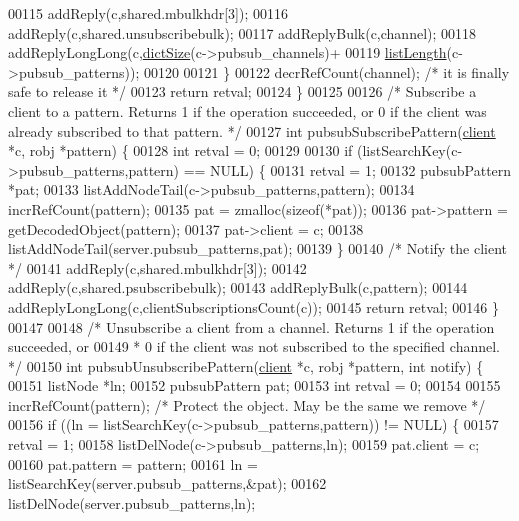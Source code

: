 \begin{DoxyCode}
00115         addReply(c,shared.mbulkhdr[3]);
00116         addReply(c,shared.unsubscribebulk);
00117         addReplyBulk(c,channel);
00118         addReplyLongLong(c,\hyperlink{dict_8h_af193430dd3d5579a52b194512f72c1f0}{dictSize}(c->pubsub\_channels)+
00119                        \hyperlink{adlist_8h_afde0ab079f934670e82119b43120e94b}{listLength}(c->pubsub\_patterns));
00120 
00121     \}
00122     decrRefCount(channel); \textcolor{comment}{/* it is finally safe to release it */}
00123     \textcolor{keywordflow}{return} retval;
00124 \}
00125 
00126 \textcolor{comment}{/* Subscribe a client to a pattern. Returns 1 if the operation succeeded, or 0 if the client was
       already subscribed to that pattern. */}
00127 \textcolor{keywordtype}{int} pubsubSubscribePattern(\hyperlink{structclient}{client} *c, robj *pattern) \{
00128     \textcolor{keywordtype}{int} retval = 0;
00129 
00130     \textcolor{keywordflow}{if} (listSearchKey(c->pubsub\_patterns,pattern) == NULL) \{
00131         retval = 1;
00132         pubsubPattern *pat;
00133         listAddNodeTail(c->pubsub\_patterns,pattern);
00134         incrRefCount(pattern);
00135         pat = zmalloc(\textcolor{keyword}{sizeof}(*pat));
00136         pat->pattern = getDecodedObject(pattern);
00137         pat->client = c;
00138         listAddNodeTail(server.pubsub\_patterns,pat);
00139     \}
00140     \textcolor{comment}{/* Notify the client */}
00141     addReply(c,shared.mbulkhdr[3]);
00142     addReply(c,shared.psubscribebulk);
00143     addReplyBulk(c,pattern);
00144     addReplyLongLong(c,clientSubscriptionsCount(c));
00145     \textcolor{keywordflow}{return} retval;
00146 \}
00147 
00148 \textcolor{comment}{/* Unsubscribe a client from a channel. Returns 1 if the operation succeeded, or}
00149 \textcolor{comment}{ * 0 if the client was not subscribed to the specified channel. */}
00150 \textcolor{keywordtype}{int} pubsubUnsubscribePattern(\hyperlink{structclient}{client} *c, robj *pattern, \textcolor{keywordtype}{int} notify) \{
00151     listNode *ln;
00152     pubsubPattern pat;
00153     \textcolor{keywordtype}{int} retval = 0;
00154 
00155     incrRefCount(pattern); \textcolor{comment}{/* Protect the object. May be the same we remove */}
00156     \textcolor{keywordflow}{if} ((ln = listSearchKey(c->pubsub\_patterns,pattern)) != NULL) \{
00157         retval = 1;
00158         listDelNode(c->pubsub\_patterns,ln);
00159         pat.client = c;
00160         pat.pattern = pattern;
00161         ln = listSearchKey(server.pubsub\_patterns,&pat);
00162         listDelNode(server.pubsub\_patterns,ln);

\end{DoxyCode}
